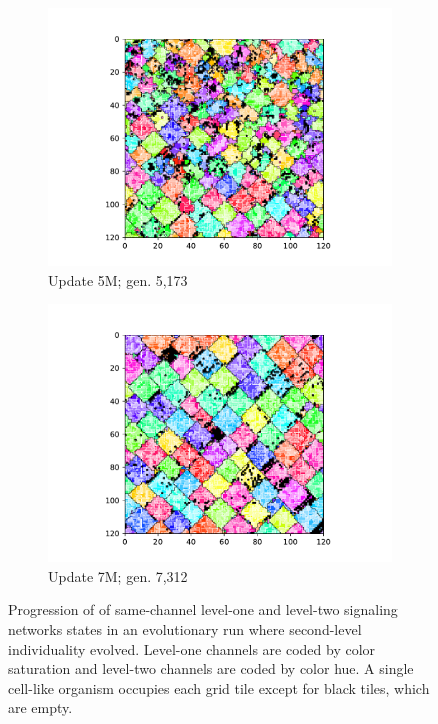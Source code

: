 \begin{figure}
\begin{center}
\begin{subfigure}[b]{0.6\columnwidth}
  \includegraphics[width=\columnwidth,trim={2.5cm 0.5cm 2.5cm 1cm},clip]{img/ChannelMap_1011_update5000000}
  \caption{Update 5M; gen. 5,173}
  \label{fig:ChannelMap_1011_update5000000}
\end{subfigure}%
\begin{subfigure}[b]{0.6\columnwidth}
  \includegraphics[width=\columnwidth,trim={2.5cm 0.5cm 2.5cm 1cm},clip]{img/ChannelMap_1011_update7000000}
  \caption{Update 7M; gen. 7,312}
  \label{fig:ChannelMap_1011_update7000000}
\end{subfigure}
\caption{
Progression of of same-channel level-one and level-two signaling networks states in an evolutionary run where second-level individuality evolved.
Level-one channels are coded by color saturation and level-two channels are coded by color hue.
A single cell-like organism occupies each grid tile except for black tiles, which are empty.
}
\label{fig:grid_progression}
\end{center}
\end{figure}
